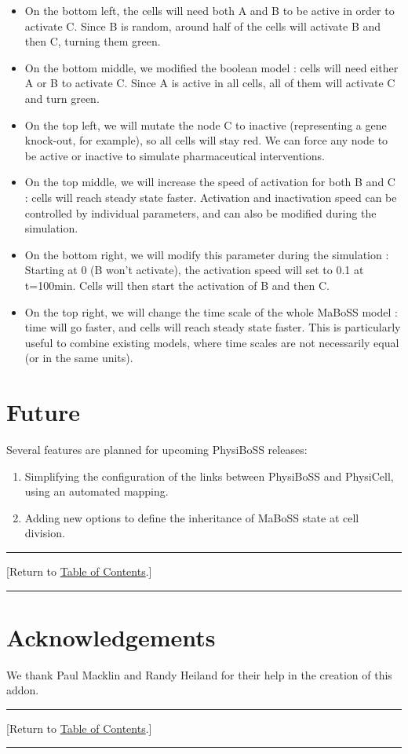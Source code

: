 \documentclass[12pt]{article}
\newcommand{\TOClink}{\begin{center}\hrule\vskip-5pt\phantom{.}\hfill[Return to \hyperlink{TOC}{Table of Contents}.]\hfill\phantom{.}\vskip3pt\hrule\end{center}}
\begin{document}
\begin{itemize}
	\item On the bottom left, the cells will need both A and B to be active in order to activate C. Since B is random, around half of the cells will activate B and then C, turning them green.
	
	\item On the bottom middle, we modified the boolean model : cells will need either A or B to activate C. Since A is active in all cells, all of them will activate C and turn green.
	
	\item On the top left, we will mutate the node C to inactive (representing a gene knock-out, for example), so all cells will stay red. We can force any node to be active or inactive to simulate pharmaceutical interventions.
	
	\item On the top middle, we will increase the speed of activation for both B and C : cells will reach steady state faster. Activation and inactivation speed can be controlled by individual parameters, and can also be modified during the simulation.
	
	\item On the bottom right, we will modify this parameter during the simulation : Starting at 0 (B won't activate), the activation speed will set to 0.1 at t=100min. Cells will then start the activation of B and then C.
		
	\item On the top right, we will change the time scale of the whole MaBoSS model : time will go faster, and cells will reach steady state faster. This is particularly useful to combine existing models, where time scales are not necessarily equal (or in the same units).
\end{itemize}



\section{Future}
\label{sec:Future_Plans}
Several features are planned for upcoming PhysiBoSS releases: 
\begin{enumerate}
\item Simplifying the configuration of the links between PhysiBoSS and PhysiCell, using an automated mapping.

\item Adding new options to define the inheritance of MaBoSS state at cell division. 

\end{enumerate}

\TOClink 

\section{Acknowledgements}
We thank Paul Macklin and Randy Heiland for their help in the creation of this addon. 
\TOClink



\end{document}
